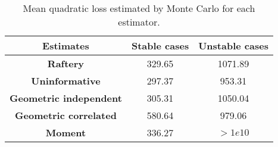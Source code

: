 \begin{table}[!ht]
    \centering
    \begin{tabular}{|c|c|c|}
    \hline
    \textbf{Estimates}             & \textbf{Stable cases} & \textbf{Unstable cases} \\ \hline
    \textbf{Raftery}               & 329.65                & 1071.89                 \\ \hline
    \textbf{Uninformative}         & 297.37                & 953.31                  \\ \hline
    \textbf{Geometric independent} & 305.31                & 1050.04                 \\ \hline
    \textbf{Geometric correlated}  & 580.64                & 979.06                  \\ \hline
    \textbf{Moment}                & 336.27                &  $>1e10$       \\ \hline
    \end{tabular}
    \caption{Mean quadratic loss estimated by Monte Carlo for each estimator.}
    \label{tab:losses}
\end{table}